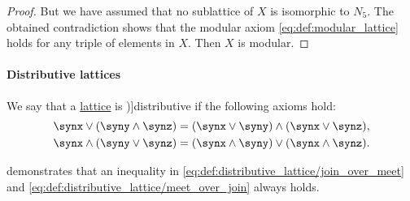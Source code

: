 \begin{proof}
  But we have assumed that no sublattice of \( X \) is isomorphic to \( N_5 \). The obtained contradiction shows that the modular axiom \eqref{eq:def:modular_lattice} holds for any triple of elements in \( X \). Then \( X \) is modular.
\end{proof}

\paragraph{Distributive lattices}

\begin{definition}\label{def:distributive_lattice}
  We say that a \hyperref[def:lattice]{lattice} is \term[ru=дистрибутивная (решётка) (\cite[def. 4.7]{Гуров2013ТеорияРешёток})]{distributive} if the following axioms hold:
  \begin{align}
    \synx \vee (\syny \wedge \synz) &= (\synx \vee \syny) \wedge (\synx \vee \synz), \label{eq:def:distributive_lattice/join_over_meet} \\
    \synx \wedge (\syny \vee \synz) &= (\synx \wedge \syny) \vee (\synx \wedge \synz). \label{eq:def:distributive_lattice/meet_over_join}
  \end{align}
\end{definition}
\begin{comments}
  \item {} demonstrates that an inequality in \eqref{eq:def:distributive_lattice/join_over_meet} and \eqref{eq:def:distributive_lattice/meet_over_join} always holds.
\end{comments}

